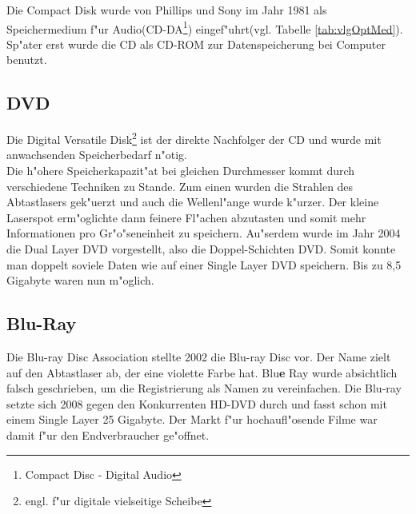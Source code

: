             Die Compact Disk wurde von Phillips und Sony im Jahr 1981 als Speichermedium f"ur Audio(CD-DA\footnote{Compact Disc - Digital Audio}) eingef"uhrt(vgl. Tabelle \ref{tab:vlgOptMed}). Sp"ater erst wurde die CD als CD-ROM zur Datenspeicherung bei Computer benutzt. 
        
        \subsection{DVD}
        \label{ch:Technisch:sec:Optische Speicherung:sub:DVD}
        
            Die Digital Versatile Disk\footnote{engl. f"ur digitale vielseitige Scheibe} ist der direkte Nachfolger der CD und wurde mit anwachsenden Speicherbedarf n"otig. 
            \\
            Die h"ohere Speicherkapazit"at bei gleichen Durchmesser kommt durch verschiedene Techniken zu Stande. Zum einen wurden die Strahlen des Abtastlasers gek"uerzt und auch die Wellenl"ange wurde k"urzer. Der kleine Laserspot erm"oglichte dann feinere Fl"achen abzutasten und somit mehr Informationen pro Gr"o"seneinheit zu speichern. Au"serdem wurde im Jahr 2004 die Dual Layer DVD vorgestellt, also die \glqq Doppel-Schichten DVD\grqq{}. Somit konnte man doppelt soviele Daten wie auf einer Single Layer DVD speichern. Bis zu 8,5 Gigabyte waren nun m"oglich.
        
        \subsection{Blu-Ray}
        \label{ch:Technisch:sec:Optische Speicherung:sub:Blu-Ray}
        
            Die Blu-ray Disc Association stellte 2002 die Blu-ray Disc vor. Der Name zielt auf den Abtastlaser ab, der eine violette Farbe hat. Blu\textbf{e} Ray wurde absichtlich falsch geschrieben, um die Registrierung als Namen zu vereinfachen. Die Blu-ray setzte sich 2008 gegen den Konkurrenten HD-DVD durch und fasst schon mit einem Single Layer 25 Gigabyte. Der Markt f"ur hochaufl"osende Filme war damit f"ur den Endverbraucher ge"offnet.
            \\
           



